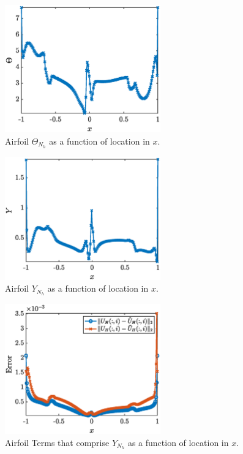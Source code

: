 \documentclass{report}
\begin{document}
% 
\begin{figure}[ht!]
\centering
\includegraphics[width =0.6\textwidth]{Figures/Airfoil_theta.eps}
\caption{Airfoil $\Theta_{N_h}$ as a function of location in $x$.} 
\label{fig:Airfoil_theta}
\end{figure}
%

% 
\begin{figure}[ht!]
\centering
\includegraphics[width =0.6\textwidth]{Figures/Airfoil_Y.eps}
\caption{Airfoil $Y_{N_h}$ as a function of location in $x$.} 
\label{fig:Airfoil_Y}
\end{figure}
%
% 
\begin{figure}[ht!]
\centering
\includegraphics[width =0.6\textwidth]{Figures/Airfoil_Y_ratio.eps}
\caption{Airfoil Terms that comprise $Y_{N_h}$ as a function of location in $x$.} 
\label{fig:Airfoil_Y_ratio}
\end{figure}
%
\end{document}

